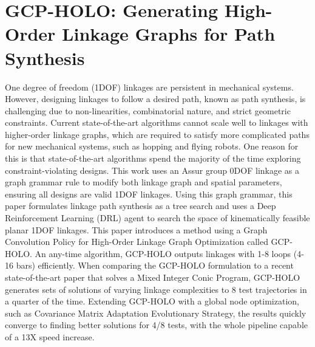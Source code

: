 \graphicspath{{sections/02_GCP_HOLO_Optimization/}}

\chapter{GCP-HOLO: Generating High-Order Linkage Graphs for Path Synthesis}\label{sec:gcpholo}
One degree of freedom (1DOF) linkages are persistent in mechanical systems. However, designing linkages to follow a desired path, known as path synthesis, is challenging due to non-linearities, combinatorial nature, and strict geometric constraints. Current state-of-the-art algorithms cannot scale well to linkages with higher-order linkage graphs, which are required to satisfy more complicated paths for new mechanical systems, such as hopping and flying robots. One reason for this is that state-of-the-art algorithms spend the majority of the time exploring constraint-violating designs. This work uses an Assur group 0DOF linkage as a graph grammar rule to modify both linkage graph and spatial parameters, ensuring all designs are valid 1DOF linkages. Using this graph grammar, this paper formulates linkage path synthesis as a tree search and uses a Deep Reinforcement Learning (DRL) agent to search the space of kinematically feasible planar 1DOF linkages. This paper introduces a method using a Graph Convolution Policy for High-Order Linkage Graph Optimization called GCP-HOLO. An any-time algorithm, GCP-HOLO outputs linkages with 1-8 loops (4-16 bars) efficiently. When comparing the GCP-HOLO formulation to a recent state-of-the-art paper that solves a Mixed Integer Conic Program, GCP-HOLO generates sets of solutions of varying linkage complexities to 8 test trajectories in a quarter of the time. Extending GCP-HOLO with a global node optimization, such as Covariance Matrix Adaptation Evolutionary Strategy, the results quickly converge to finding better solutions for 4/8 tests, with the whole pipeline capable of a 13X speed increase. 

